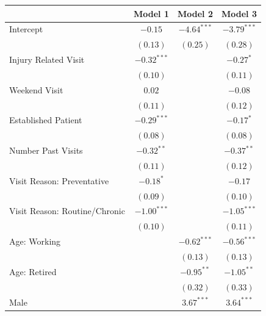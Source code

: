 \documentclass[12pt,twoside]{reedthesis}
\begin{document}
  \begin{table}
  \begin{center}
  \begin{small}
  \begin{tabular}{l c c c }
  \hline
   & Model 1 & Model 2 & Model 3 \\
  \hline
  Intercept                     & $-0.15$       & $-4.64^{***}$ & $-3.79^{***}$ \\
                                & $(0.13)$      & $(0.25)$      & $(0.28)$      \\
  Injury Related Visit          & $-0.32^{***}$ &               & $-0.27^{*}$   \\
                                & $(0.10)$      &               & $(0.11)$      \\
  Weekend Visit                 & $0.02$        &               & $-0.08$       \\
                                & $(0.11)$      &               & $(0.12)$      \\
  Established Patient           & $-0.29^{***}$ &               & $-0.17^{*}$   \\
                                & $(0.08)$      &               & $(0.08)$      \\
  Number Past Visits            & $-0.32^{**}$  &               & $-0.37^{**}$  \\
                                & $(0.11)$      &               & $(0.12)$      \\
  Visit Reason: Preventative    & $-0.18^{*}$   &               & $-0.17$       \\
                                & $(0.09)$      &               & $(0.10)$      \\
  Visit Reason: Routine/Chronic & $-1.00^{***}$ &               & $-1.05^{***}$ \\
                                & $(0.10)$      &               & $(0.11)$      \\
  Age: Working                  &               & $-0.62^{***}$ & $-0.56^{***}$ \\
                                &               & $(0.13)$      & $(0.13)$      \\
  Age: Retired                  &               & $-0.95^{**}$  & $-1.05^{**}$  \\
                                &               & $(0.32)$      & $(0.33)$      \\
  Male                          &               & $3.67^{***}$  & $3.64^{***}$  \\

\end{tabular}
\end{small}
\end{center}
\end{table}
\end{document}
